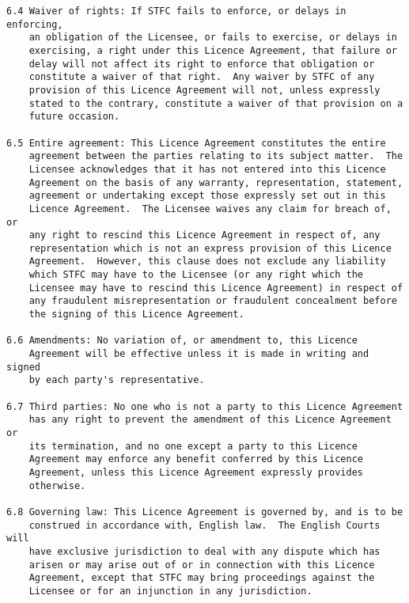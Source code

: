 \begin{verbatim}
6.4 Waiver of rights: If STFC fails to enforce, or delays in enforcing,
    an obligation of the Licensee, or fails to exercise, or delays in
    exercising, a right under this Licence Agreement, that failure or
    delay will not affect its right to enforce that obligation or
    constitute a waiver of that right.  Any waiver by STFC of any
    provision of this Licence Agreement will not, unless expressly
    stated to the contrary, constitute a waiver of that provision on a
    future occasion.

6.5 Entire agreement: This Licence Agreement constitutes the entire
    agreement between the parties relating to its subject matter.  The
    Licensee acknowledges that it has not entered into this Licence
    Agreement on the basis of any warranty, representation, statement,
    agreement or undertaking except those expressly set out in this
    Licence Agreement.  The Licensee waives any claim for breach of, or
    any right to rescind this Licence Agreement in respect of, any
    representation which is not an express provision of this Licence
    Agreement.  However, this clause does not exclude any liability
    which STFC may have to the Licensee (or any right which the
    Licensee may have to rescind this Licence Agreement) in respect of
    any fraudulent misrepresentation or fraudulent concealment before
    the signing of this Licence Agreement.

6.6 Amendments: No variation of, or amendment to, this Licence
    Agreement will be effective unless it is made in writing and signed
    by each party's representative.

6.7 Third parties: No one who is not a party to this Licence Agreement
    has any right to prevent the amendment of this Licence Agreement or
    its termination, and no one except a party to this Licence
    Agreement may enforce any benefit conferred by this Licence
    Agreement, unless this Licence Agreement expressly provides
    otherwise.

6.8 Governing law: This Licence Agreement is governed by, and is to be
    construed in accordance with, English law.  The English Courts will
    have exclusive jurisdiction to deal with any dispute which has
    arisen or may arise out of or in connection with this Licence
    Agreement, except that STFC may bring proceedings against the
    Licensee or for an injunction in any jurisdiction.
\end{verbatim}
